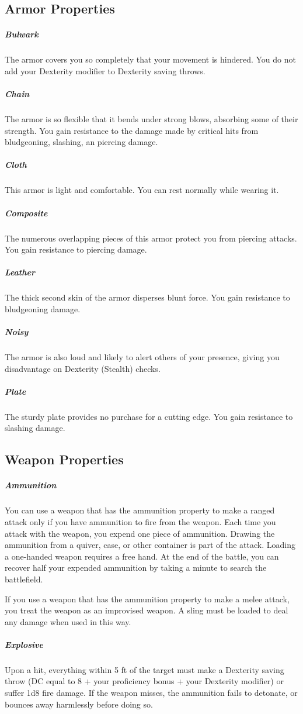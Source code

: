 
\subsection*{Armor Properties}
\subparagraph{Bulwark} The armor covers you so completely that your movement is hindered.
You do not add your Dexterity modifier to Dexterity saving throws.

\subparagraph{Chain} The armor is so flexible that it bends under strong blows, absorbing some of their strength.
You gain resistance to the damage made by critical hits from bludgeoning, slashing, an piercing damage.

\subparagraph{Cloth} This armor is light and comfortable.
You can rest normally while wearing it.

\subparagraph{Composite} The numerous overlapping pieces of this armor protect you from piercing attacks.
You gain resistance to piercing damage.

\subparagraph{Leather} The thick second skin of the armor disperses blunt force.
You gain resistance to bludgeoning damage.

\subparagraph{Noisy} The armor is also loud and likely to alert others of your presence, giving you disadvantage on Dexterity (Stealth) checks.

\subparagraph{Plate} The sturdy plate provides no purchase for a cutting edge.
You gain resistance to slashing damage.

\subsection*{Weapon Properties}
\subparagraph{Ammunition} You can use a weapon that has the ammunition property to make a ranged attack only if you have ammunition to fire from the weapon.
Each time you attack with the weapon, you expend one piece of ammunition.
Drawing the ammunition from a quiver, case, or other container is part of the attack.
Loading a one-handed weapon requires a free hand.
At the end of the battle, you can recover half your expended ammunition by taking a minute to search the battlefield.

If you use a weapon that has the ammunition property to make a melee attack, you treat the weapon as an improvised weapon.
A sling must be loaded to deal any damage when used in this way.

\subparagraph{Explosive} Upon a hit, everything within 5 ft of the target must make a Dexterity saving throw (DC equal to 8 + your proficiency bonus + your Dexterity modifier) or suffer 1d8 fire damage.
If the weapon misses, the ammunition fails to detonate, or bounces away harmlessly before doing so.

